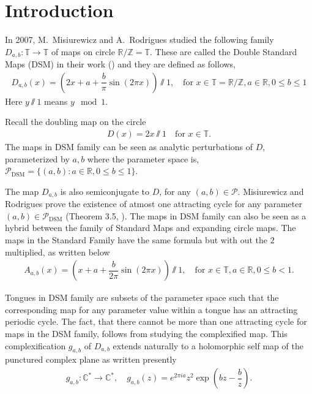 \documentclass[12pt]{amsart}
\numberwithin{equation}{section}
\newenvironment{nouppercase}{%
  \let\uppercase\relax%
  \renewcommand{\uppercasenonmath}[1]{}}{}
\theoremstyle{remark}
\begin{document}
\begin{nouppercase}
\maketitle
\end{nouppercase}




\section{Introduction}

In 2007,  M.~Misiurewicz and A.~Rodrigues studied the following family $D_{a,b}:\mathbb T \to \mathbb T$ of maps on circle $\mathbb R/\mathbb Z=\mathbb {T}$. These are called the Double Standard Maps (DSM) in their work (\cite{MR}) and they are defined as follows,
   \begin{align*}
    D_{a,b}(x)=\left(2x+a+\dfrac{b}{\pi} \sin(2\pi x)\right)\sslash 1, \quad {\text {for }} x\in \mathbb T=\mathbb R/\mathbb Z, a \in \mathbb{R}, 0 \leq b \leq 1
\end{align*}
Here $y\sslash1$ means $y \mod 1$.  

Recall the doubling map on the circle
\begin{align*}
    D(x)= 2x\sslash1 \quad {\text {for }} x\in \mathbb T.
\end{align*}
The maps in DSM family can be seen as analytic perturbations of $D$, parameterized by $a,b$ where the parameter space is,  $\mathcal P_{\textrm{DSM}}=\{(a,b):a\in \mathbb R, 0\le b\le 1\}$. 


The map $D_{a,b}$ is also  semiconjugate to $D$, for any $(a,b)\in \mathcal P$. Misiurewicz and  Rodrigues prove the existence of atmost one attracting cycle for any  parameter $(a,b) \in \mathcal{P}_{\text{DSM}}$ (Theorem 3.5, \cite{MR}). The maps in DSM family can also be seen as a hybrid between the family of Standard Maps and expanding circle maps. The maps in the Standard Family  have the same formula but with out the $2$ multiplied, as written below
\begin{align*}
    A_{a,b}(x)=\left(x+a+\dfrac{b}{2\pi} \sin(2\pi x)\right)\sslash 1, \quad{\text {for }} x\in \mathbb T, a \in \mathbb{R} ,0 \leq b < 1.
\end{align*}

Tongues in DSM family are subsets of the parameter space such that the corresponding map for any parameter value within a tongue has an attracting periodic cycle. 
The fact, that there  cannot be more than one attracting cycle for maps in the DSM family, follows from studying the complexified map. This complexification $g_{a,b}$ of $D_{a,b}$ extends naturally to a holomorphic self map of the punctured complex plane as written presently
    \begin{align*}
    g_{a,b}: \mathbb{C}^* \to \mathbb{C}^*,\quad  g_{a,b}(z)=e^{2\pi i a}z^2\exp\left( bz-\dfrac{b}{z}  \right).
\end{align*} 
\end{document}
